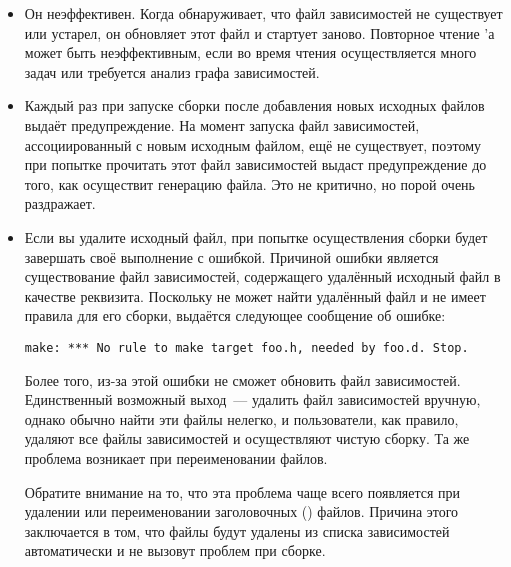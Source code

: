 \begin{itemize}
\item Он неэффективен. Когда \GNUmake{} обнаруживает, что файл
зависимостей не существует или устарел, он обновляет этот файл и
стартует заново. Повторное чтение \Makefile{}'а может быть
неэффективным, если во время чтения осуществляется много задач или
требуется анализ графа зависимостей.
\item Каждый раз при запуске сборки после добавления новых исходных
файлов \GNUmake{} выдаёт предупреждение. На момент запуска файл
зависимостей, ассоциированный с новым исходным файлом, ещё не
существует, поэтому при попытке прочитать этот файл зависимостей
\GNUmake{} выдаст предупреждение до того, как осуществит генерацию
файла. Это не критично, но порой очень раздражает.
\item Если вы удалите исходный файл, при попытке осуществления сборки
\GNUmake{} будет завершать своё выполнение с ошибкой. Причиной ошибки
является существование файл зависимостей, содержащего удалённый
исходный файл в качестве реквизита. Поскольку \GNUmake{} не может
найти удалённый файл и не имеет правила для его сборки, выдаётся
следующее сообщение об ошибке:

{\footnotesize
\begin{verbatim}
make: *** No rule to make target foo.h, needed by foo.d. Stop.
\end{verbatim}
}

Более того, из-за этой ошибки \GNUmake{} не сможет обновить файл
зависимостей. Единственный возможный выход~--- удалить файл
зависимостей вручную, однако обычно найти эти файлы нелегко, и
пользователи, как правило, удаляют все файлы зависимостей и
осуществляют чистую сборку. Та же проблема возникает при
переименовании файлов.

Обратите внимание на то, что эта проблема чаще всего появляется при
удалении или переименовании заголовочных () файлов.
Причина этого заключается в том, что  файлы будут удалены
из списка зависимостей автоматически и не вызовут проблем при сборке.
\end{itemize}

